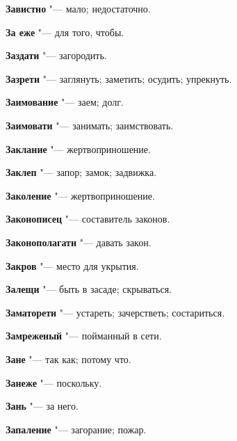 \begin{mymulticols}{2}
\noindent\textbf{Завистно} "--- мало; недостаточно. 




\noindent\textbf{За еже} "--- для того, чтобы. 




\noindent\textbf{Заздати} "--- загородить. 




\noindent\textbf{Зазрети} "--- заглянуть; заметить; осудить; упрекнуть. 




\noindent\textbf{Заимование} "--- заем; долг. 




\noindent\textbf{Заимовати} "--- занимать; заимствовать. 




\noindent\textbf{Заклание} "--- жертвоприношение. 




\noindent\textbf{Заклеп} "--- запор; замок; задвижка. 




\noindent\textbf{Заколение} "--- жертвоприношение. 




\noindent\textbf{Законописец} "--- составитель законов. 




\noindent\textbf{Законополагати} "--- давать закон. 




\noindent\textbf{Закров} "--- место для укрытия. 




\noindent\textbf{Залещи} "--- быть в засаде; скрываться. 




\noindent\textbf{Заматорети} "--- устареть; зачерстветь; состариться. 




\noindent\textbf{Замреженый} "--- пойманный в сети. 




\noindent\textbf{Зане} "--- так как; потому что. 




\noindent\textbf{Занеже} "--- поскольку. 




\noindent\textbf{Зань} "--- за него. 




\noindent\textbf{Запаление} "--- загорание; пожар. 





\end{mymulticols}
